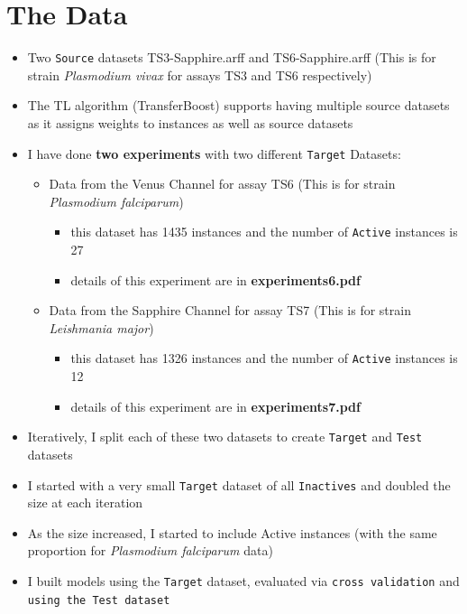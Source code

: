 \documentclass[a4paper,12pt, english]{article}
\begin{document}
\section{The Data}
\begin{itemize}
\item Two \texttt{Source} datasets TS3-Sapphire.arff and TS6-Sapphire.arff (This is for strain \emph{Plasmodium vivax} for assays TS3 and TS6 respectively)
\item The TL algorithm (TransferBoost) supports having multiple source datasets as it assigns weights to instances as well as source datasets
\item I have done \textbf{two experiments} with two different \texttt{Target} Datasets:
\begin{itemize}
\item Data from the Venus Channel for assay TS6 (This is for strain \emph{Plasmodium falciparum})
\begin{itemize}
\item this dataset has 1435 instances and the number of \texttt{Active} instances is 27
\item details of this experiment are in \textbf{experiments6.pdf}
\end{itemize}
\item Data from the Sapphire Channel for assay TS7 (This is for strain \emph{Leishmania major})
\begin{itemize}
\item this dataset has 1326 instances and the number of \texttt{Active} instances is 12
\item details of this experiment are in \textbf{experiments7.pdf}
\end{itemize}
\end{itemize}
\item Iteratively, I split each of these two datasets to create \texttt{Target} and \texttt{Test} datasets
\item I started with a very small \texttt{Target} dataset of all \texttt{Inactives} and doubled the size at each iteration
\item As the size increased, I started to include Active instances (with the same proportion for \emph{Plasmodium falciparum} data)
\item I built models using the \texttt{Target} dataset, evaluated via \texttt{cross validation} and \texttt{using the Test dataset}

\end{itemize}
\end{document}
